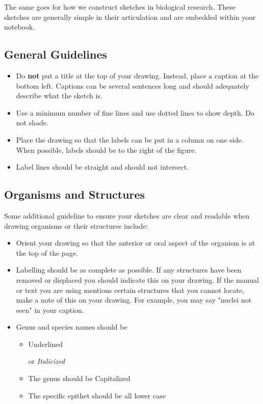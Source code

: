 \documentclass[
]{book}
\providecommand{\tightlist}{%
  \setlength{\itemsep}{0pt}\setlength{\parskip}{0pt}}
\begin{document}
The same goes for how we construct sketches in biological research. These sketches are generally simple in their articulation and are embedded within your notebook.

\hypertarget{general-guidelines}{%
\subsection*{General Guidelines}\label{general-guidelines}}

\begin{itemize}
\tightlist
\item
  Do \textbf{not} put a title at the top of your drawing. Instead, place a caption at the bottom left. Captions can be several sentences long and should adequately describe what the sketch is.
\item
  Use a minimum number of fine lines and use dotted lines to show depth. Do not shade.
\item
  Place the drawing so that the labels can be put in a column on one side. When possible, labels should be to the right of the figure.
\item
  Label lines should be straight and should not intersect.
\end{itemize}

\hypertarget{organisms-and-structures}{%
\subsection*{Organisms and Structures}\label{organisms-and-structures}}

Some additional guideline to ensure your sketches are clear and readable when drawing organisms or their structures include:

\begin{itemize}
\tightlist
\item
  Orient your drawing so that the anterior or oral aspect of the organism is at the top of the page.
\item
  Labelling should be as complete as possible. If any structures have been removed or displaced you should indicate this on your drawing. If the manual or text you are using mentions certain structures that you cannot locate, make a note of this on your drawing. For example, you may say "nuclei not seen" in your caption.
\item
  Genus and species names should be

  \begin{itemize}
  \item
    Underlined

    or \emph{Italicized}
  \item
    The genus should be Capitalized
  \item
    The specific epithet should be all lower case
  \end{itemize}
\end{itemize}
\end{document}
